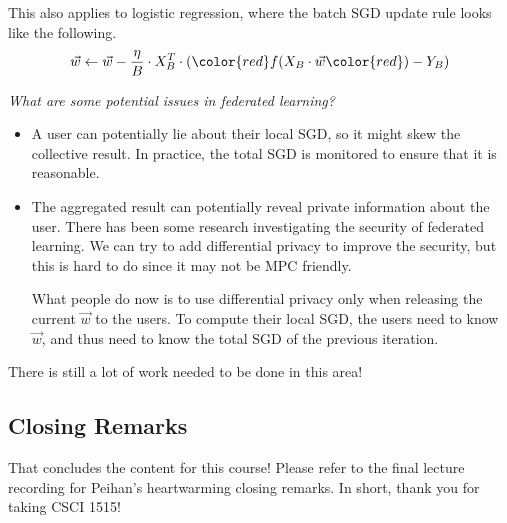 This also applies to logistic regression, where the batch SGD update rule looks like the following.
$$\vec{w} \gets \vec{w} - \frac{\eta}{B} \cdot X_B^T \cdot ({\color{red}f(}X_B \cdot \vec{w}{\color{red})} - Y_B)$$

\begin{remark}
    \textit{What are some potential issues in federated learning?}
    
    \begin{itemize}
        \item A user can potentially lie about their local SGD, so it might skew the collective result. In practice, the total SGD is monitored to ensure that it is reasonable.
        \item The aggregated result can potentially reveal private information about the user. There has been some research investigating the security of federated learning. We can try to add differential privacy to improve the security, but this is hard to do since it may not be MPC friendly.
        
        What people do now is to use differential privacy only when releasing the current $\vec{w}$ to the users. To compute their local SGD, the users need to know $\vec{w}$, and thus need to know the total SGD of the previous iteration.
    \end{itemize}

    There is still a lot of work needed to be done in this area!
\end{remark}

\subsection{Closing Remarks}

That concludes the content for this course! Please refer to the final lecture recording for Peihan's heartwarming closing remarks. In short, thank you for taking CSCI 1515!